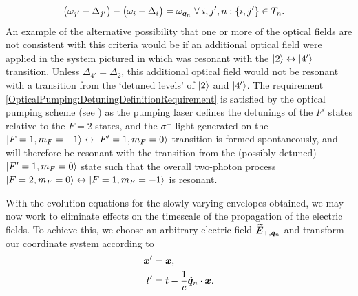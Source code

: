 \begin{align}
    \big(\omega_{j'} - \Delta_{j'}\big) - \big(\omega_i - \Delta_i\big) &= \omega_{\vect{q}_n} \;\forall \; i, j', n : \left\{i, j'\right\} \in T_n. \label{OpticalPumping:DetuningDefinitionRequirement}
\end{align}
An example of the alternative possibility that one or more of the optical fields are not consistent with this criteria would be if an additional optical field were applied in the system pictured in  which was resonant with the ${\left|2\right>} \leftrightarrow {\ensuremath{\left|4'\right>}}$ transition.  Unless $\Delta_{4'} = \Delta_{2}$, this additional optical field would not be resonant with a transition from the `detuned levels' of ${\left|2\right>}$ and ${\left|4'\right>}$.  The requirement \eqref{OpticalPumping:DetuningDefinitionRequirement} is satisfied by the optical pumping scheme (see ) as the pumping laser defines the detunings of the $F'$ states relative to the $F=2$ states, and the $\sigma^+$ light generated on the ${\left|F=1, m_F=-1\right>} \leftrightarrow {\ensuremath{\left|F'=1, m_F=0\right>}}$ transition is formed spontaneously, and will therefore be resonant with the transition from the (possibly detuned) ${\left|F'=1, m_F=0\right>}$ state such that the overall two-photon process ${\left|F=2, m_F=0\right>} \leftrightarrow {\ensuremath{\left|F=1, m_F=-1\right>}}$ is resonant.

With the evolution equations for the slowly-varying envelopes obtained, we may now work to eliminate effects on the timescale of the propagation of the electric fields.  To achieve this, we choose an arbitrary electric field $\widetilde{E}_{+, \bm{q}_n}$  and transform our coordinate system according to
\begin{align}
  \bm{x}' &= \bm{x}, \\
  t' &= t - \frac{1}{c} \check{\bm{q}}_n \cdot \bm{x}.
\end{align}

